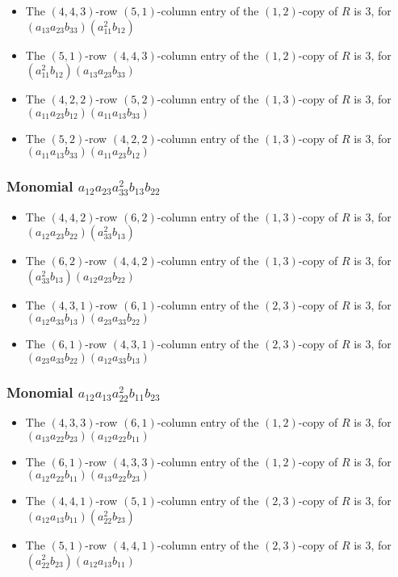 \documentclass{article}
\begin{document}
\begin{itemize}
\item The $(4, 4, 3)$-row $(5, 1)$-column entry of the $ \left(1, 2\right) $-copy of $R$ is $ 3 $, for $( a_{13} a_{23} b_{33} )( a_{11}^{2} b_{12} )$ 
\item The $(5, 1)$-row $(4, 4, 3)$-column entry of the $ \left(1, 2\right) $-copy of $R$ is $ 3 $, for $( a_{11}^{2} b_{12} )( a_{13} a_{23} b_{33} )$ 
\item The $(4, 2, 2)$-row $(5, 2)$-column entry of the $ \left(1, 3\right) $-copy of $R$ is $ 3 $, for $( a_{11} a_{23} b_{12} )( a_{11} a_{13} b_{33} )$ 
\item The $(5, 2)$-row $(4, 2, 2)$-column entry of the $ \left(1, 3\right) $-copy of $R$ is $ 3 $, for $( a_{11} a_{13} b_{33} )( a_{11} a_{23} b_{12} )$ 
\end{itemize}
\subsubsection{Monomial $ a_{12} a_{23} a_{33}^{2} b_{13} b_{22} $}

\begin{itemize}
\item The $(4, 4, 2)$-row $(6, 2)$-column entry of the $ \left(1, 3\right) $-copy of $R$ is $ 3 $, for $( a_{12} a_{23} b_{22} )( a_{33}^{2} b_{13} )$ 
\item The $(6, 2)$-row $(4, 4, 2)$-column entry of the $ \left(1, 3\right) $-copy of $R$ is $ 3 $, for $( a_{33}^{2} b_{13} )( a_{12} a_{23} b_{22} )$ 
\item The $(4, 3, 1)$-row $(6, 1)$-column entry of the $ \left(2, 3\right) $-copy of $R$ is $ 3 $, for $( a_{12} a_{33} b_{13} )( a_{23} a_{33} b_{22} )$ 
\item The $(6, 1)$-row $(4, 3, 1)$-column entry of the $ \left(2, 3\right) $-copy of $R$ is $ 3 $, for $( a_{23} a_{33} b_{22} )( a_{12} a_{33} b_{13} )$ 
\end{itemize}
\subsubsection{Monomial $ a_{12} a_{13} a_{22}^{2} b_{11} b_{23} $}

\begin{itemize}
\item The $(4, 3, 3)$-row $(6, 1)$-column entry of the $ \left(1, 2\right) $-copy of $R$ is $ 3 $, for $( a_{13} a_{22} b_{23} )( a_{12} a_{22} b_{11} )$ 
\item The $(6, 1)$-row $(4, 3, 3)$-column entry of the $ \left(1, 2\right) $-copy of $R$ is $ 3 $, for $( a_{12} a_{22} b_{11} )( a_{13} a_{22} b_{23} )$ 
\item The $(4, 4, 1)$-row $(5, 1)$-column entry of the $ \left(2, 3\right) $-copy of $R$ is $ 3 $, for $( a_{12} a_{13} b_{11} )( a_{22}^{2} b_{23} )$ 
\item The $(5, 1)$-row $(4, 4, 1)$-column entry of the $ \left(2, 3\right) $-copy of $R$ is $ 3 $, for $( a_{22}^{2} b_{23} )( a_{12} a_{13} b_{11} )$ 
\end{itemize}
\end{document}
